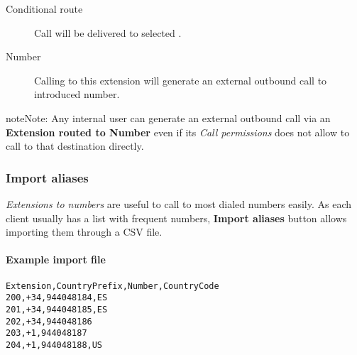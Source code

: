 \documentclass[letterpaper,10pt,english]{sphinxmanual}
\begin{document}
\begin{description}
\item[{Conditional route}] \leavevmode{}\label{administration_portal/client/vpbx/extensions:term-conditional-route}
Call will be delivered to selected {\hyperref[administration_portal/client/vpbx/routing_endpoints/conditional_routes:conditional\string-routes]{}}.

\item[{Number}] \leavevmode{}\label{administration_portal/client/vpbx/extensions:term-9}
Calling to this extension will generate an external outbound call
to introduced number.

\end{description}

\begin{notice}{note}{Note:}
Any internal user can generate an external outbound call via an \textbf{Extension
routed to Number} even if its \emph{Call permissions} does not allow to
call to that destination directly.
\end{notice}


\subsubsection{Import aliases}
\label{administration_portal/client/vpbx/extensions:import-aliases}
\emph{Extensions to numbers} are useful to call to most dialed numbers easily. As each
client usually has a list with frequent numbers, \textbf{Import aliases} button allows
importing them through a CSV file.
\paragraph{Example import file}

\begin{Verbatim}[commandchars=\\\{\}]
Extension,CountryPrefix,Number,CountryCode
200,+34,944048184,ES
201,+34,944048185,ES
202,+34,944048186
203,+1,944048187
204,+1,944048188,US
\end{Verbatim}
\end{document}

